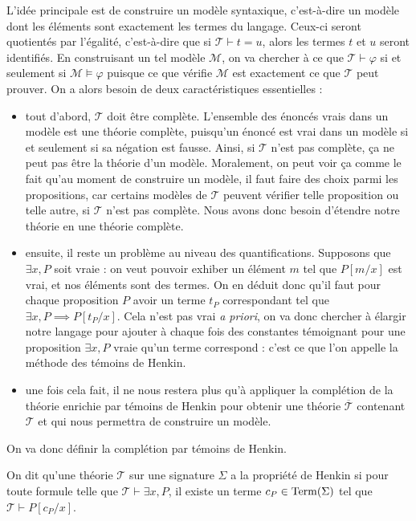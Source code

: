 L'idée principale est de construire un modèle syntaxique, c'est-à-dire un modèle
dont les éléments sont exactement les termes du langage. Ceux-ci seront
quotientés par l'égalité, c'est-à-dire que si $\mathcal T \vdash t = u$, alors
les termes $t$ et $u$ seront identifiés. En construisant un tel modèle
$\mathcal M$, on va chercher à ce que $\mathcal T \vdash \varphi$ si et
seulement si $\mathcal M\vDash \varphi$ puisque ce que vérifie $\mathcal M$ est
exactement ce que $\mathcal T$ peut prouver. On a alors besoin de deux
caractéristiques essentielles :
\begin{itemize}
\item tout d'abord, $\mathcal T$ doit être complète. L'ensemble des énoncés vrais
  dans un modèle est une théorie complète, puisqu'un énoncé est vrai dans un
  modèle si et seulement si sa négation est fausse. Ainsi, si $\mathcal T$ n'est
  pas complète, ça ne peut pas être la théorie d'un modèle. Moralement, on peut
  voir ça comme le fait qu'au moment de construire un modèle, il faut faire des
  choix parmi les propositions, car certains modèles de $\mathcal T$ peuvent
  vérifier telle proposition ou telle autre, si $\mathcal T$ n'est pas complète.
  Nous avons donc besoin d'étendre notre théorie en une théorie complète.
\item ensuite, il reste un problème au niveau des quantifications. Supposons que
  $\exists x,P$ soit vraie : on veut pouvoir exhiber un élément $m$ tel que
  $P[m/x]$ est vrai, et nos éléments sont des termes. On en déduit donc qu'il
  faut pour chaque proposition $P$ avoir un terme $t_P$ correspondant tel que
  $\exists x, P \implies P[t_P/x]$. Cela n'est pas vrai \textit{a priori}, on va
  donc chercher à élargir notre langage pour ajouter à chaque fois des constantes
  témoignant pour une proposition $\exists x,P$ vraie qu'un terme correspond :
  c'est ce que l'on appelle la méthode des témoins de Henkin.
\item une fois cela fait, il ne nous restera plus qu'à appliquer la complétion
  de la théorie enrichie par témoins de Henkin pour obtenir une théorie
  $\overline{\mathcal T}$ contenant $\mathcal T$ et qui nous permettra de
  construire un modèle.
\end{itemize}

On va donc définir la complétion par témoins de Henkin.

\begin{definition}
  On dit qu'une théorie $\mathcal T$ sur une signature $\Sigma$ a la propriété de
  Henkin si pour toute formule telle que $\mathcal T\vdash\exists x, P$, il
  existe un terme $c_P\in\operatorname{Term}(\Sigma)$ tel que $\mathcal T\vdash P[c_P/x]$.
\end{definition}

